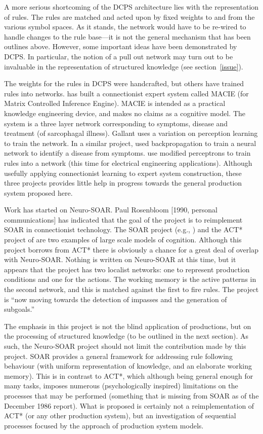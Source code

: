 A more serious shortcoming of the DCPS architecture lies with the
representation of rules. The rules are matched and acted upon by fixed
weights to and from the various symbol spaces.  As it stands, the
network would have to be re-wired to handle changes to the rule
base---it is not the general mechanism that has been outlines above.
However, some important ideas have been demonstrated by DCPS.  In
particular, the notion of a pull out network may turn out to be
invaluable in the representation of structured knowledge (see
section~\ref{issue}).

The weights for the rules in DCPS were handcrafted, but others have
trained rules into networks.  has built a connectionist
expert system called MACIE (for Matrix Controlled Inference Engine).
MACIE is intended as a practical knowledge engineering device, and
makes no claims as a cognitive model. The system is a three layer
network corresponding to symptoms, disease and treatment (of
sarcophagal illness).  Gallant uses a variation on perception learning
to train the network.   In a similar project,  used
backpropagation to train a neural network to identify a disease from
symptoms.   use modified perceptrons to train rules
into a network (this time for electrical engineering applications).
Although usefully applying connectionist learning to expert system
construction, these three projects provides little help in progress
towards the general production system proposed here.

Work has started on Neuro-SOAR. Paul Rosenbloom [1990, personal
communications] has indicated that the goal of the project is to
reimplement SOAR in connectionist technology.  The SOAR project (e.g.,
) and the ACT* project of  are two examples
of large scale models of cognition.  Although this project borrows
from ACT* there is obviously a chance for a great deal of overlap with
Neuro-SOAR.  Nothing is written on Neuro-SOAR at this time, but it
appears that the project has two localist networks: one to represent
production conditions and one for the actions.  The working memory is
the active patterns in the second network, and this is matched against
the first to fire rules.  The project is ``now moving towards the
detection of impasses and the generation of subgoals.''

The emphasis in this project is not the blind application of
productions, but on the processing of structured knowledge (to be
outlined in the next section).  As such, the Neuro-SOAR project should
not limit the contribution made by this project. SOAR provides a
general framework for addressing rule following behaviour (with
uniform representation of knowledge, and an elaborate working memory).
This is in contrast to ACT*, which although being general enough for
many tasks, imposes numerous (psychologically inspired) limitations on
the processes that may be performed (something that is missing from
SOAR as of the December 1986 report).  What is proposed is certainly
not a reimplementation of ACT* (or any other production system), but
an investigation of sequential processes focused by the approach of
production system models.



